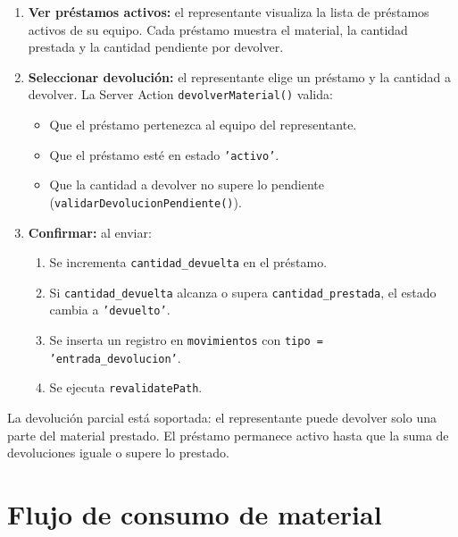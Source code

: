 \documentclass[12pt,a4paper,oneside]{report}
\newcommand{\file}[1]{\texttt{\color{cecyteDark}#1}}
\begin{document}
\begin{enumerate}
  \item \textbf{Ver préstamos activos:} el representante visualiza la lista de préstamos activos de su equipo. Cada préstamo muestra el material, la cantidad prestada y la cantidad pendiente por devolver.
  \item \textbf{Seleccionar devolución:} el representante elige un préstamo y la cantidad a devolver. La Server Action \file{devolverMaterial()} valida:
    \begin{itemize}
      \item Que el préstamo pertenezca al equipo del representante.
      \item Que el préstamo esté en estado \file{'activo'}.
      \item Que la cantidad a devolver no supere lo pendiente (\file{validarDevolucionPendiente()}).
    \end{itemize}
  \item \textbf{Confirmar:} al enviar:
    \begin{enumerate}
      \item Se incrementa \file{cantidad\_devuelta} en el préstamo.
      \item Si \file{cantidad\_devuelta} alcanza o supera \file{cantidad\_prestada}, el estado cambia a \file{'devuelto'}.
      \item Se inserta un registro en \file{movimientos} con \file{tipo = 'entrada\_devolucion'}.
      \item Se ejecuta \file{revalidatePath}.
    \end{enumerate}
\end{enumerate}

La devolución parcial está soportada: el representante puede devolver solo una parte del material prestado. El préstamo permanece activo hasta que la suma de devoluciones iguale o supere lo prestado.

\section{Flujo de consumo de material}
\end{document}
